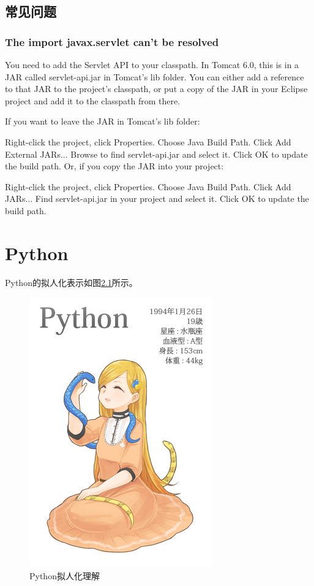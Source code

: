 \documentclass{book}
\begin{document}
\section{常见问题}

\subsection{The import javax.servlet can't be resolved}

You need to add the Servlet API to your classpath. 
In Tomcat 6.0, this is in a JAR called servlet-api.jar in Tomcat's lib folder. 
You can either add a reference to that JAR to the project's classpath, 
or put a copy of the JAR in your Eclipse project and add it to the classpath from there.

If you want to leave the JAR in Tomcat's lib folder:

Right-click the project, click Properties.
Choose Java Build Path.
Click Add External JARs...
Browse to find servlet-api.jar and select it.
Click OK to update the build path.
Or, if you copy the JAR into your project:

Right-click the project, click Properties.
Choose Java Build Path.
Click Add JARs...
Find servlet-api.jar in your project and select it.
Click OK to update the build path.


\chapter{Python}

Python的拟人化表示如图\ref{code:PythonVirtual}所示。

\begin{figure}[htbp]
	\centering
	\includegraphics[scale=0.6]{PythonVirtual.jpg}
	\caption{Python拟人化理解}
	\label{code:PythonVirtual}
\end{figure}
\end{document}
